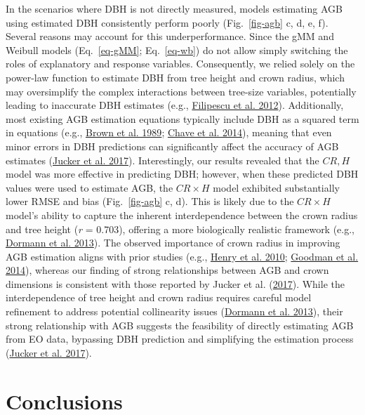 \documentclass[
  12pt,
  letterpaper,
  DIV=11,
  numbers=noendperiod]{scrartcl}
\begin{document}
In the scenarios where DBH is not directly measured, models estimating
AGB using estimated DBH consistently perform poorly (Fig.~\ref{fig-agb}
c, d, e, f). Several reasons may account for this underperformance.
Since the gMM and Weibull models (Eq.~\ref{eq-gMM}; Eq.~\ref{eq-wb}) do
not allow simply switching the roles of explanatory and response
variables. Consequently, we relied solely on the power-law function to
estimate DBH from tree height and crown radius, which may oversimplify
the complex interactions between tree-size variables, potentially
leading to inaccurate DBH estimates (e.g.,
\protect\hyperlink{ref-Filipescu2012}{Filipescu et al. 2012}).
Additionally, most existing AGB estimation equations typically include
DBH as a squared term in equations (e.g.,
\protect\hyperlink{ref-Brown1989}{Brown et al. 1989};
\protect\hyperlink{ref-Chave2014}{Chave et al. 2014}), meaning that even
minor errors in DBH predictions can significantly affect the accuracy of
AGB estimates (\protect\hyperlink{ref-Jucker2017}{Jucker et al. 2017}).
Interestingly, our results revealed that the \(CR,H\) model was more
effective in predicting DBH; however, when these predicted DBH values
were used to estimate AGB, the \(CR \times H\) model exhibited
substantially lower RMSE and bias (Fig.~\ref{fig-agb} c, d). This is
likely due to the \(CR \times H\) model's ability to capture the
inherent interdependence between the crown radius and tree height
(\emph{r} = 0.703), offering a more biologically realistic framework
(e.g., \protect\hyperlink{ref-Dormann2013}{Dormann et al. 2013}). The
observed importance of crown radius in improving AGB estimation aligns
with prior studies (e.g., \protect\hyperlink{ref-Henry2010}{Henry et al.
2010}; \protect\hyperlink{ref-Goodman2014}{Goodman et al. 2014}),
whereas our finding of strong relationships between AGB and crown
dimensions is consistent with those reported by Jucker et al.
(\protect\hyperlink{ref-Jucker2017}{2017}). While the interdependence of
tree height and crown radius requires careful model refinement to
address potential collinearity issues
(\protect\hyperlink{ref-Dormann2013}{Dormann et al. 2013}), their strong
relationship with AGB suggests the feasibility of directly estimating
AGB from EO data, bypassing DBH prediction and simplifying the
estimation process (\protect\hyperlink{ref-Jucker2017}{Jucker et al.
2017}).

\hypertarget{conclusions}{%
\section{Conclusions}\label{conclusions}}
\end{document}
